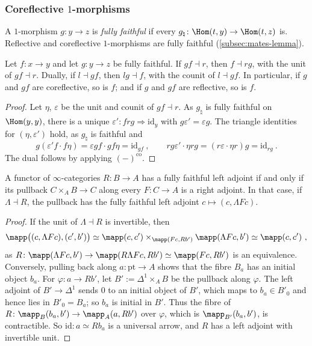 \subsubsection*{Coreflective $1$-morphisms}

A $1$-morphism $g\colon y \to z$ is \emph{fully faithful} if every $g_{\natural}\colon \Hom(t,y) \to \Hom(t,z)$ is. Reflective and coreflective $1$-morphisms are fully faithful (\cref{subsec:mates-lemma}).

\begin{lem}[cancellation]
\label{lem:ff-cancel}
Let $f\colon x \to y$ and let $g\colon y \to z$ be fully faithful. If $gf \dashv r$, then $f \dashv rg$, with the unit of $gf \dashv r$. Dually, if $l \dashv gf$, then $lg \dashv f$, with the counit of $l \dashv gf$.
In particular, if $g$ and $gf$ are coreflective, so is $f$; and if $g$ and $gf$ are reflective, so is $f$.
\end{lem}

\begin{proof}
Let $\eta$, $\varepsilon$ be the unit and counit of $gf \dashv r$. As $g_{\natural}$ is fully faithful on $\Hom(y,y)$, there is a unique $\varepsilon'\colon frg \Rightarrow \mathrm{id}_{y}$ with $g\varepsilon' = \varepsilon g$. The triangle identities for $(\eta,\varepsilon')$ hold, as $g_{\natural}$ is faithful and
\[
g(\varepsilon'f \cdot f\eta) = \varepsilon gf \cdot gf\eta = \mathrm{id}_{gf} \ , \qquad rg\varepsilon' \cdot \eta rg = (r\varepsilon \cdot \eta r)g = \mathrm{id}_{rg} \ .
\]
The dual follows by applying $(-)^{\mathrm{co}}$.
\end{proof}

\begin{lem}
\label{lem:corefl-pullback}
A functor of $\infty$-categories $R\colon B \to A$ has a fully faithful left adjoint if and only if its pullback $C \times_{A} B \to C$ along every $F\colon C \to A$ is a right adjoint. In that case, if $\Lambda \dashv R$, the pullback has the fully faithful left adjoint $c \mapsto (c,\Lambda Fc)$.
\end{lem}

\begin{proof}
If the unit of $\Lambda \dashv R$ is invertible, then
\[
\mapp\bigl((c,\Lambda Fc),(c',b')\bigr) \simeq \mapp(c,c') \times_{\mapp(Fc,Rb')} \mapp(\Lambda Fc,b') \simeq \mapp(c,c') \ ,
\]
as $R\colon \mapp(\Lambda Fc,b') \to \mapp(R\Lambda Fc,Rb') \simeq \mapp(Fc,Rb')$ is an equivalence.
Conversely, pulling back along $a\colon \mathrm{pt} \to A$ shows that the fibre $B_{a}$ has an initial object $b_{a}$. For $\varphi\colon a \to Rb'$, let $B' := \Delta^{1} \times_{A} B$ be the pullback along $\varphi$. The left adjoint of $B' \to \Delta^{1}$ sends $0$ to an initial object of $B'$, which maps to $b_{a} \in B'_{0}$ and hence lies in $B'_{0} = B_{a}$; so $b_{a}$ is initial in $B'$. Thus the fibre of $R\colon \mapp_{B}(b_{a},b') \to \mapp_{A}(a,Rb')$ over $\varphi$, which is $\mapp_{B'}(b_{a},b')$, is contractible. So $\mathrm{id}\colon a \simeq Rb_{a}$ is a universal arrow, and $R$ has a left adjoint with invertible unit.
\end{proof}

